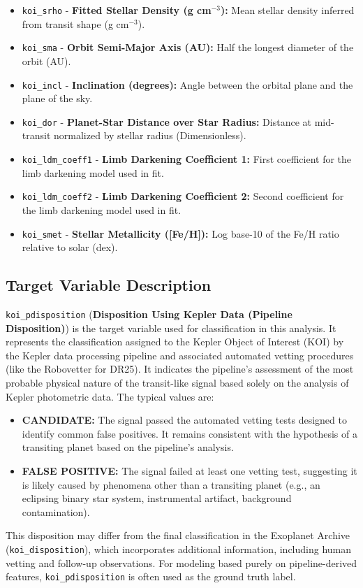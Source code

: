 \begin{itemize}
    \item \texttt{koi\_srho} - \textbf{Fitted Stellar Density (g cm$^{-3}$):} Mean stellar density inferred from transit shape (g cm$^{-3}$).
    \item \texttt{koi\_sma} - \textbf{Orbit Semi-Major Axis (AU):} Half the longest diameter of the orbit (AU).
    \item \texttt{koi\_incl} - \textbf{Inclination (degrees):} Angle between the orbital plane and the plane of the sky.
    \item \texttt{koi\_dor} - \textbf{Planet-Star Distance over Star Radius:} Distance at mid-transit normalized by stellar radius (Dimensionless).
    \item \texttt{koi\_ldm\_coeff1} - \textbf{Limb Darkening Coefficient 1:} First coefficient for the limb darkening model used in fit.
    \item \texttt{koi\_ldm\_coeff2} - \textbf{Limb Darkening Coefficient 2:} Second coefficient for the limb darkening model used in fit.
    \item \texttt{koi\_smet} - \textbf{Stellar Metallicity ([Fe/H]):} Log base-10 of the Fe/H ratio relative to solar (dex).
\end{itemize}

\subsection{Target Variable Description}
\texttt{koi\_pdisposition} (\textbf{Disposition Using Kepler Data (Pipeline Disposition)}) is the target variable used for classification in this analysis. It represents the classification assigned to the Kepler Object of Interest (KOI) by the Kepler data processing pipeline and associated automated vetting procedures (like the Robovetter for DR25). It indicates the pipeline's assessment of the most probable physical nature of the transit-like signal based solely on the analysis of Kepler photometric data. The typical values are:
\begin{itemize}
    \item \textbf{CANDIDATE:} The signal passed the automated vetting tests designed to identify common false positives. It remains consistent with the hypothesis of a transiting planet based on the pipeline's analysis.
    \item \textbf{FALSE POSITIVE:} The signal failed at least one vetting test, suggesting it is likely caused by phenomena other than a transiting planet (e.g., an eclipsing binary star system, instrumental artifact, background contamination).
\end{itemize}
This disposition may differ from the final classification in the Exoplanet Archive (\texttt{koi\_disposition}), which incorporates additional information, including human vetting and follow-up observations. For modeling based purely on pipeline-derived features, \texttt{koi\_pdisposition} is often used as the ground truth label.

